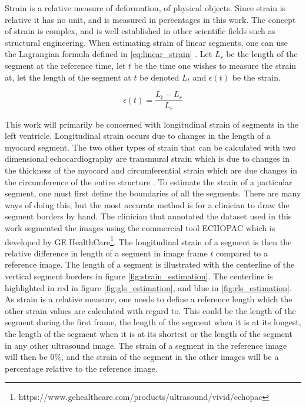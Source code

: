 Strain is a relative measure of deformation, of physical objects. Since strain is relative it has no unit, and is measured in percentages in this work. The concept of strain is complex, and is well established in other scientific fields such as structural engineering. When estimating strain of linear segments, one can use the Lagrangian formula defined in \eqref{eq:linear_strain} \cite{basic_concepts}. Let $L_r$ be the length of the segment at the reference time, let $t$ be the time one wishes to measure the strain at, let the length of the segment at $t$ be denoted $L_t$ and $\epsilon(t)$ be the strain.

\begin{equation}
    \epsilon(t) = \frac{L_t - L_r}{L_r}
    \label{eq:linear_strain}
\end{equation}

This work will primarily be concerned with longitudinal strain of segments in the left ventricle. Longitudinal strain occurs due to changes in the length of a myocard segment. The two other types of strain that can be calculated with two dimensional echocardiography are transmural strain which is due to changes in the thickness of the myocard and circumferential strain which are due changes in the circumference of the entire structure \cite{basic concepts}. To estimate the strain of a particular segment, one must first define the boundaries of all the segments. There are many ways of doing this, but the most accurate method is for a clinician to draw the segment borders by hand. The clinician that annotated the dataset used in this work segmented the images using the commercial tool ECHOPAC which is developed by GE HealthCare\footnote{https://www.gehealthcare.com/products/ultrasound/vivid/echopac}. The longitudinal strain of a segment is then the relative difference in length of a segment in image frame $t$ compared to a reference image. The length of a segment is illustrated with the centerline of the vertical segment borders in figure \ref{fig:strain_estimation}. The centerline is highlighted in red in figure \ref{fig:gls_estimation}, and blue in \ref{fig:rls_estimation}. As strain is a relative measure, one needs to define a reference length which the other strain values are calculated with regard to. This could be the length of the segment during the first frame, the length of the segment when it is at its longest, the length of the segment when it is at its shortest or the length of the segment in any other ultrasound image. The strain of a segment in the reference image will then be $0\%$, and the strain of the segment in the other images will be a percentage relative to the reference image.

